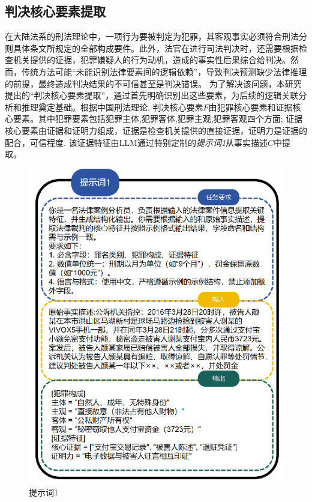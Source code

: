 \subsection{\heiti 判决核心要素提取}
在大陆法系的刑法理论中，一项行为要被判定为犯罪，其客观事实必须符合刑法分则具体条文所规定的全部构成要件。此外，法官在进行司法判决时，还需要根据检查机关提供的证据，犯罪嫌疑人的行为动机，造成的事实性后果综合给判决。然而，传统方法可能“未能识别法律要素间的逻辑依赖”，导致判决预测缺少法律推理的前提，最终造成判决结果的不可信甚至是判决错误。
为了解决该问题，本研究提出的“判决核心要素提取”，通过首先明确识别出这些要素，为后续的逻辑关联分析和推理奠定基础。根据中国刑法理论, 判决核心要素$F$由犯罪核心要素和证据核心要素。其中犯罪要素包括犯罪主体,犯罪客体,犯罪主观,犯罪客观四个方面;
证据核心要素由证据和证明力组成，证据是检查机关提供的直接证据，证明力是证据的配合，可信程度. 该证据特征由LLM通过特别定制的\textit{提示词1}从事实描述$C$中提取。

\begin{figure}[H]
	\centering
	\includegraphics[width=0.8\linewidth]{fig/prompt1.pdf}
	\caption{提示词1}
	\label{fig:prompt1}
\end{figure}

